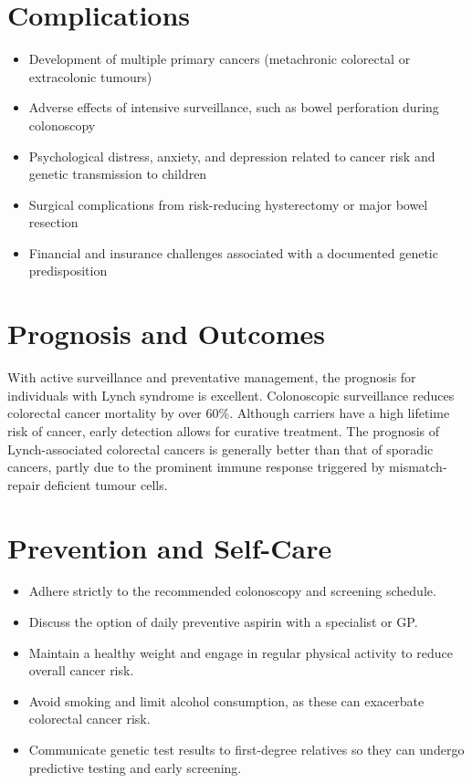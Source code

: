 \section*{Complications}
\begin{itemize}
    \item Development of multiple primary cancers (metachronic colorectal or extracolonic tumours)
    \item Adverse effects of intensive surveillance, such as bowel perforation during colonoscopy
    \item Psychological distress, anxiety, and depression related to cancer risk and genetic transmission to children
    \item Surgical complications from risk-reducing hysterectomy or major bowel resection
    \item Financial and insurance challenges associated with a documented genetic predisposition
\end{itemize}

\section*{Prognosis and Outcomes}
With active surveillance and preventative management, the prognosis for individuals with Lynch syndrome is excellent. Colonoscopic surveillance reduces colorectal cancer mortality by over 60\%. Although carriers have a high lifetime risk of cancer, early detection allows for curative treatment. The prognosis of Lynch-associated colorectal cancers is generally better than that of sporadic cancers, partly due to the prominent immune response triggered by mismatch-repair deficient tumour cells.

\section*{Prevention and Self-Care}
\begin{itemize}
    \item Adhere strictly to the recommended colonoscopy and screening schedule.
    \item Discuss the option of daily preventive aspirin with a specialist or GP.
    \item Maintain a healthy weight and engage in regular physical activity to reduce overall cancer risk.
    \item Avoid smoking and limit alcohol consumption, as these can exacerbate colorectal cancer risk.
    \item Communicate genetic test results to first-degree relatives so they can undergo predictive testing and early screening.
\end{itemize}

